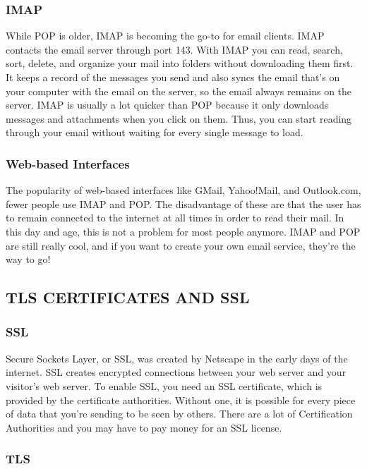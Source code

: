 \documentclass{article}
\begin{document}
\subsubsection*{IMAP}

\indent\indent While POP is older, IMAP is becoming the go-to for email clients. IMAP contacts the email server through port 143. With IMAP you can read, search, sort, delete, and organize your mail into folders without downloading them first. It keeps a record of the messages you send and also syncs the email that's on your computer with the email on the server, so the email always remains on the server. IMAP is usually a lot quicker than POP because it only downloads messages and attachments when you click on them. Thus, you can start reading through your email without waiting for every single message to load.

\subsubsection*{Web-based Interfaces}

\indent\indent The popularity of web-based interfaces like GMail, Yahoo!Mail, and Outlook.com, fewer people use IMAP and POP. The disadvantage of these are that the user has to remain connected to the internet at all times in order to read their mail. In this day and age, this is not a problem for most people anymore. IMAP and POP are still really cool, and if you want to create your own email service, they're the way to go!


\subsection*{TLS CERTIFICATES AND SSL}

\subsubsection*{SSL}

\indent\indent Secure Sockets Layer, or SSL, was created by Netscape in the early days of the internet. SSL creates encrypted connections between your web server and your visitor's web server. To enable SSL, you need an SSL certificate, which is provided by the certificate authorities. Without one, it is possible for every piece of data that you're sending to be seen by others. There are a lot of Certification Authorities and you may have to pay money for an SSL license.

\subsubsection*{TLS}
\end{document}
